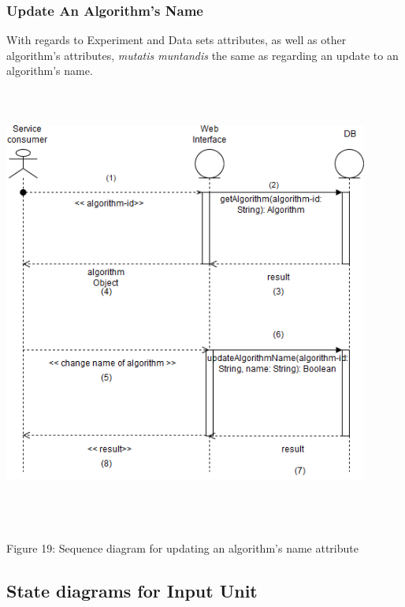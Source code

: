    \subsubsection{Update An Algorithm's Name}
    \par With regards to Experiment and Data sets attributes, as well as other algorithm's attributes,
    { \textit{mutatis muntandis} the same as regarding an update to an algorithm's name.} \newline \newline
    \includegraphics[width=12cm,height=15cm,keepaspectratio]{input_unit/images/update_algorithm_sequence_diagram.png}
    \begin{center}
    	\small{Figure 19: Sequence diagram for updating an algorithm's name attribute }
    \end{center}
    \newpage

\subsection{State diagrams for Input Unit}
